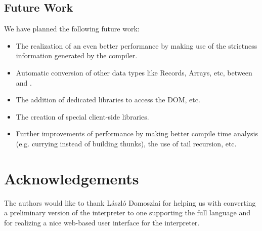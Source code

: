 \subsection{Future Work}
We have planned the following future work:
\begin{itemize}
\item The realization of  an even better performance by making use of the strictness information generated by the \Clean compiler.
\item Automatic conversion of other data types like Records, Arrays, etc, between \Sapl and \JS.
\item The addition of dedicated libraries to access the DOM, etc.
\item The creation of special client-side \iTask libraries.
\item Further improvements of performance by making better compile time analysis (e.g. \JS currying instead of building thunks),
the use of tail recursion, etc.
\end{itemize}

\section*{Acknowledgements}
The authors would like to thank L\'aszl\'o Domoszlai for helping us with converting a preliminary version of the interpreter to one supporting the full \Sapl language and
for realizing a nice web-based user interface for the interpreter.
